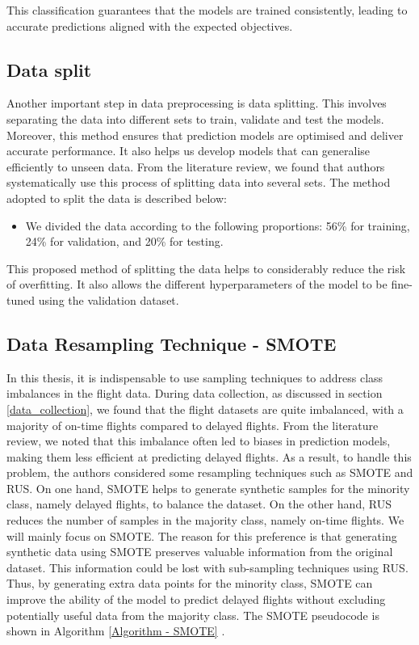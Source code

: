 \documentclass[12pt,oneside]{book} %
\begin{document}
This classification guarantees that the models are trained consistently, leading to accurate predictions aligned with the expected objectives.

\subsection{Data split}

\noindent Another important step in data preprocessing is data splitting. This involves separating the data into different sets to train, validate and test the models. Moreover, this method ensures that prediction models are optimised and deliver accurate performance. It also helps us develop models that can generalise efficiently to unseen data. From the literature review, we found that authors systematically use this process of splitting data into several sets. The method adopted to split the data is described below: 

\begin{itemize}
    \item We divided the data according to the following proportions: 56\% for training, 24\% for validation, and 20\% for testing.
\end{itemize}

\noindent This proposed method of splitting the data helps to considerably reduce the risk of overfitting. It also allows the different hyperparameters of the model to be fine-tuned using the validation dataset.

\subsection{Data Resampling Technique - SMOTE}

\noindent In this thesis, it is indispensable to use sampling techniques to address class imbalances in the flight data. During data collection, as discussed in section \ref{data_collection}, we found that the flight datasets are quite imbalanced, with a majority of on-time flights compared to delayed flights. From the literature review, we noted that this imbalance often led to biases in prediction models, making them less efficient at predicting delayed flights. As a result, to handle this problem, the authors considered some resampling techniques such as SMOTE and RUS. On one hand, SMOTE helps to generate synthetic samples for the minority class, namely delayed flights, to balance the dataset. On the other hand, RUS reduces the number of samples in the majority class, namely on-time flights. We will mainly focus on SMOTE. The reason for this preference is that generating synthetic data using SMOTE preserves valuable information from the original dataset. This information could be lost with sub-sampling techniques using RUS. Thus, by generating extra data points for the minority class, SMOTE can improve the ability of the model to predict delayed flights without excluding potentially useful data from the majority class. The SMOTE pseudocode is shown in Algorithm \ref{Algorithm - SMOTE} \citep{SMOTE_Algorithm,SMOTE_Algorithm1}.
\end{document}
